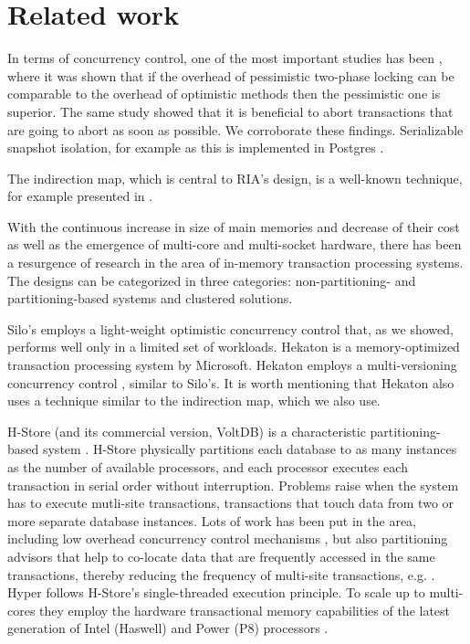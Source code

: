 
\section{Related work}

In terms of concurrency control, one of the most important studies has been \cite{AgrawalCL87}, where it was shown that if the overhead of pessimistic two-phase locking can be comparable to the overhead of optimistic methods then the pessimistic one is superior. The same study showed that it is beneficial to abort transactions that are going to abort as soon as possible. We corroborate these findings. 
Serializable snapshot isolation, for example as this is implemented in Postgres \cite{PortsG12}. 
 
The indirection map, which is central to RIA's design, is a well-known technique, for example presented in \cite{SadoghiRCB13}.

With the continuous increase in size of main memories and decrease of their cost as well as the emergence of multi-core and multi-socket hardware, there has been a resurgence of research in the area of in-memory transaction processing systems.  
The designs can be categorized in three categories: non-partitioning- and partitioning-based systems and clustered solutions. 

Silo's  \cite{TuZKLM13} employs a light-weight optimistic concurrency control that, as we showed, performs well only in a limited set of workloads. 
Hekaton \cite{Diaconu+13} is a memory-optimized transaction processing system by Microsoft. Hekaton employs a multi-versioning concurrency control \cite{LarsonBDFPZ11}, similar to Silo's. It is worth mentioning that Hekaton also uses a technique similar to the indirection map, which we also use. 


H-Store (and its commercial version, VoltDB) is a characteristic partitioning-based system \cite{Kallman+08}. H-Store physically partitions each database to as many instances as the number of available processors, and each processor executes each transaction in serial order without interruption.  
Problems raise when the system has to execute mutli-site transactions, transactions that touch data from two or more separate database instances. Lots of work has been put in the area, including low overhead concurrency control mechanisms \cite{JonesAM10}, but also partitioning advisors that help to co-locate data that are frequently accessed in the same transactions, thereby reducing the frequency of multi-site transactions, e.g. \cite{CurinoJZM10,PavloJZ11,TranNST14}.
Hyper \cite{KemperN11} follows H-Store's single-threaded execution principle.  To scale up to multi-cores they employ the hardware transactional memory capabilities of the latest generation of Intel (Haswell) and Power (P8) processors \cite{LeisKN14}. 

